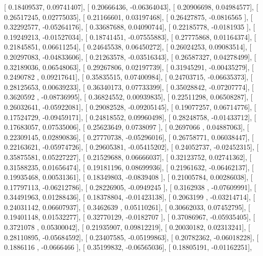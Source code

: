 \documentclass{article}
\begin{document}
       [ 0.18409537,  0.09741407],
       [ 0.20666436, -0.06364043],
       [ 0.20906698,  0.04984577],
       [ 0.26517245,  0.02775035],
       [ 0.21166601,  0.03197468],
       [ 0.26427875, -0.0816565 ],
       [ 0.32292577, -0.05264176],
       [ 0.33687688,  0.04090744],
       [ 0.22185778, -0.0181935 ],
       [ 0.19249213, -0.01527034],
       [ 0.18741451, -0.07555883],
       [ 0.27775868,  0.01164374],
       [ 0.21845851,  0.06611254],
       [ 0.24645538,  0.06450272],
       [ 0.26024253,  0.09083514],
       [ 0.20297083, -0.04833606],
       [ 0.21263578, -0.03516343],
       [ 0.26587327,  0.04278499],
       [ 0.32189036,  0.06548063],
       [ 0.29267806,  0.02197739],
       [ 0.31945291, -0.00435279],
       [ 0.2490782 ,  0.09217641],
       [ 0.35835515,  0.07400984],
       [ 0.24703715, -0.06635373],
       [ 0.28125653,  0.00639233],
       [ 0.36340173,  0.07733399],
       [ 0.35028842, -0.07207774],
       [ 0.3620592 , -0.08736995],
       [ 0.36824552,  0.00939835],
       [ 0.22511298,  0.06508287],
       [ 0.26032641, -0.05922081],
       [ 0.29082528, -0.09205145],
       [ 0.19077257,  0.06714776],
       [ 0.17524729, -0.09459171],
       [ 0.24818552,  0.09960498],
       [ 0.28248758, -0.01433712],
       [ 0.17683057,  0.07535006],
       [ 0.25623649,  0.0738097 ],
       [ 0.2697066 ,  0.04887063],
       [ 0.22309145,  0.02890836],
       [ 0.27770738, -0.05296016],
       [ 0.26758771,  0.06038447],
       [ 0.22163621, -0.05974726],
       [ 0.29605381, -0.05415202],
       [ 0.24052737, -0.02452315],
       [ 0.35875581,  0.05227227],
       [ 0.21529688,  0.06666037],
       [ 0.32123752,  0.02741362],
       [ 0.31588235,  0.01656474],
       [ 0.19181196,  0.08699936],
       [ 0.21961632, -0.06462137],
       [ 0.19935468,  0.00531361],
       [ 0.18349803, -0.0839408 ],
       [ 0.21005784,  0.00286038],
       [ 0.17797113, -0.06212786],
       [ 0.28226905, -0.0949245 ],
       [ 0.3162938 , -0.07609991],
       [ 0.34491963,  0.01288436],
       [ 0.18378804, -0.01423138],
       [ 0.2063199 , -0.03214714],
       [ 0.24031142,  0.06607937],
       [ 0.3462639 ,  0.05110261],
       [ 0.30662033,  0.07452795],
       [ 0.19401148,  0.01532277],
       [ 0.32770129, -0.0182707 ],
       [ 0.37086967, -0.05935405],
       [ 0.3721078 ,  0.05300042],
       [ 0.21935907,  0.09812219],
       [ 0.20030182,  0.02313241],
       [ 0.28110895, -0.05684592],
       [ 0.23407585, -0.05199863],
       [ 0.20782362, -0.06018228],
       [ 0.1886116 , -0.0666466 ],
       [ 0.35199832, -0.06565036],
       [ 0.18805191, -0.01162251],
\end{document}
